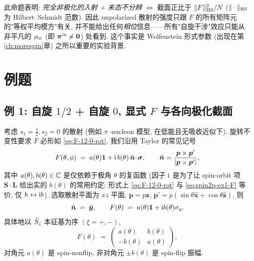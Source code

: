 \begin{remark}
此命题表明: \emph{完全非极化的入射 + 末态不分辨} $\iff$ 截面正比于 $\|F\|_{\rm HS}^2/N$ ($\|\cdot\|_{\rm HS}$ 为 Hilbert--Schmidt 范数). 因此 unpolarized 散射的强度只跟 $F$ 的所有矩阵元的"等权平均模方"有关, 并不能给出任何\emph{相位}信息——所有"自旋干涉"效应只能从非平凡的 $\rho_{\rm in}$ (即 $\bm\pi^{\rm in}\ne\bm 0$) 处看到. 这个事实是 Wolfenstein 形式参数 (出现在第\ref{ch:morespin}章) 之所以重要的实验背景.
\end{remark}

\section{例题}\label{sec:spin2p-examples}

\subsection{例 1: 自旋 $1/2$ + 自旋 $0$, 显式 $F$ 与各向极化截面}\label{sec:spin2p-ex1}

考虑 $s_1=\tfrac12,s_2=0$ 的散射 (例如 $\pi$--nucleon 模型, 在低能且无吸收近似下). 旋转不变性要求 $F$ 必形如 \eqref{eq:F-12-0-rot}, 我们沿用 Taylor 的常见记号
\begin{equation}
  F(\theta,\phi)\;=\;a(\theta)\mathbf 1+\mathrm{i}\,b(\theta)\,\hat{\bm n}\!\cdot\!\bm\sigma,
  \qquad \hat{\bm n}=\frac{\bm p\times\bm p'}{|\bm p\times\bm p'|},
  \label{eq:spin2p-ex1-F}
\end{equation}
其中 $a(\theta),b(\theta)\in\mathbb{C}$ 是仅依赖于极角 $\theta$ 的复函数 (因子 $\mathrm{i}$ 是为了让 spin-orbit 项 $\bm S\cdot\bm L$ 给出实的 $b(\theta)$ 的常用约定; 形式上 \eqref{eq:F-12-0-rot} 与 \eqref{eq:spin2p-ex1-F} 等价, 仅 $h\leftrightarrow\mathrm{i} b$). 选取散射平面为 $xz$ 平面, $\bm p=p\hat{\bm z}$, $\bm p'=p(\sin\theta\hat{\bm x}+\cos\theta\hat{\bm z})$, 则
\begin{equation}
  \hat{\bm n}\;=\;\hat{\bm y},\qquad
  F(\theta)\;=\;a(\theta)\mathbf 1+\mathrm{i} b(\theta)\sigma_y.
\end{equation}
具体地以 $\hat{S}_z$ 本征基为序 $(\xi=+,-)$,
\begin{equation}
  F(\theta)\;=\;\begin{pmatrix}a(\theta)& b(\theta)\\ -b(\theta)& a(\theta)\end{pmatrix},
  \label{eq:spin2p-ex1-F-matrix}
\end{equation}
对角元 $a(\theta)$ 是 spin-nonflip, 非对角元 $\pm b(\theta)$ 是 spin-flip 振幅.

